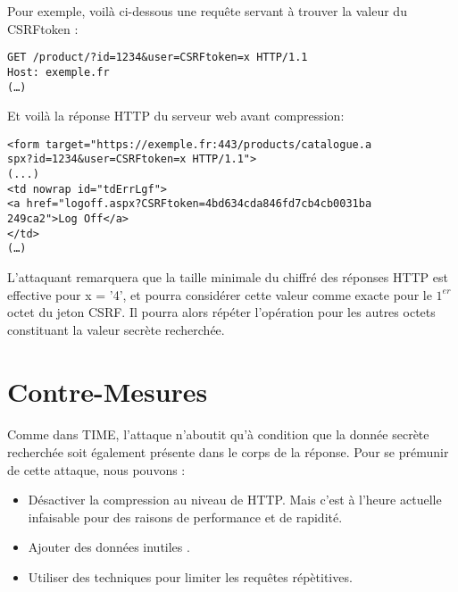Pour exemple, voilà ci-dessous une requête servant à trouver la valeur du CSRFtoken :

\begin{verbatim}
GET /product/?id=1234&user=CSRFtoken=x HTTP/1.1
Host: exemple.fr
(…)
\end{verbatim}

Et voilà la réponse HTTP du serveur web avant compression:

\begin{verbatim}
<form target="https://exemple.fr:443/products/catalogue.a
spx?id=1234&user=CSRFtoken=x HTTP/1.1">
(...)
<td nowrap id="tdErrLgf">
<a href="logoff.aspx?CSRFtoken=4bd634cda846fd7cb4cb0031ba
249ca2">Log Off</a>
</td>
(…)
\end{verbatim}

L'attaquant remarquera que la taille minimale du chiffré des réponses HTTP est effective pour x = '4', et pourra considérer cette valeur comme exacte pour le $1^{er}$ octet du jeton CSRF. Il pourra alors répéter l'opération pour les autres octets constituant la valeur secrète recherchée.

\section{Contre-Mesures}
\paragraph{}
Comme dans TIME, l'attaque n'aboutit qu'à condition que la donnée secrète recherchée soit également présente dans le corps de la réponse. Pour se prémunir de cette attaque, nous pouvons :

\begin{itemize}
  \item Désactiver la compression au niveau de HTTP. Mais c'est à l'heure actuelle infaisable pour des raisons de performance et de rapidité. 
  \item Ajouter des données inutiles .
  \item Utiliser des techniques pour limiter les requêtes répètitives.
\end{itemize}
